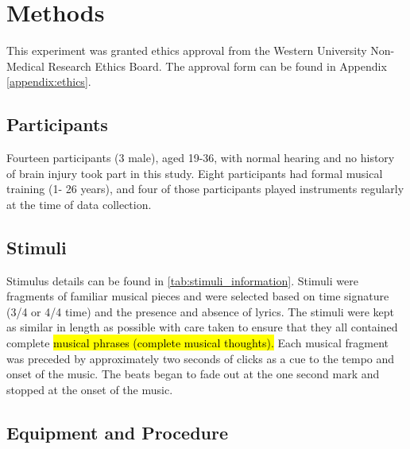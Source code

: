 \chapter{Methods}
This experiment was granted ethics approval from the Western University Non-Medical Research Ethics Board. 
The approval form can be found in Appendix \ref{appendix:ethics}.
\section{Participants}
Fourteen participants (3 male), aged 19-36, with normal hearing and no history of brain injury took part in this study. Eight participants had formal musical training (1- 26 years), and four of those participants played instruments regularly at the time of data collection.
\section{Stimuli}
Stimulus details can be found in \autoref{tab:stimuli_information}.
Stimuli were fragments of familiar musical pieces and were selected based on time signature (3/4 or 4/4 time) and the presence and absence of lyrics. 
The stimuli were kept as similar in length as possible with care taken to ensure that they all contained complete \hl{musical phrases (complete musical thoughts).}
Each musical fragment was preceded by approximately two seconds of clicks as a cue to the tempo and onset of the music. The beats began to fade out at the one second mark and stopped at the onset of the music. 

\section{Equipment and Procedure}
